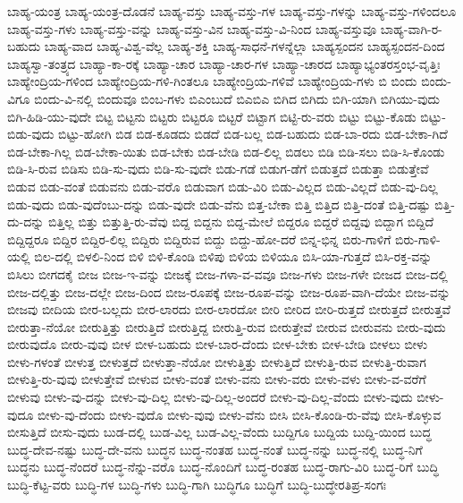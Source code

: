 {ಬಾಹ್ಯ-ಯಂತ್ರ
ಬಾಹ್ಯ-ಯಂತ್ರ-ದೊಡನೆ
ಬಾಹ್ಯ-ವಸ್ತು
ಬಾಹ್ಯ-ವಸ್ತು-ಗಳ
ಬಾಹ್ಯ-ವಸ್ತು-ಗಳನ್ನು
ಬಾಹ್ಯ-ವಸ್ತು-ಗಳಿಂದಲೂ
ಬಾಹ್ಯ-ವಸ್ತು-ಗಳು
ಬಾಹ್ಯ-ವಸ್ತು-ವನ್ನು
ಬಾಹ್ಯ-ವಸ್ತು-ವಿನ
ಬಾಹ್ಯ-ವಸ್ತು-ವಿ-ನಿಂದ
ಬಾಹ್ಯ-ವಸ್ತುವೂ
ಬಾಹ್ಯ-ವಾಗಿ-ರ-ಬಹುದು
ಬಾಹ್ಯ-ವಾದ
ಬಾಹ್ಯ-ವಿಶ್ವ-ವೆಲ್ಲ
ಬಾಹ್ಯ-ಶಕ್ತಿ
ಬಾಹ್ಯ-ಸಾಧನೆ-ಗಳನ್ನೆಲ್ಲಾ
ಬಾಹ್ಯಸ್ಪಂದನ
ಬಾಹ್ಯಸ್ಪಂದನ-ದಿಂದ
ಬಾಹ್ಯಸ್ವಾ-ತಂತ್ರ್ಯದ
ಬಾಹ್ಯಾ-ಕಾ-ರಕ್ಕೆ
ಬಾಹ್ಯಾ-ಚಾರ
ಬಾಹ್ಯಾ-ಚಾರ-ಗಳ
ಬಾಹ್ಯಾ-ಚಾರದ
ಬಾಹ್ಯಾಭ್ಯಂತರಸ್ತಂಭ-ವೃತ್ತಿಃ
ಬಾಹ್ಯೇಂದ್ರಿಯ-ಗಳಿಂದ
ಬಾಹ್ಯೇಂದ್ರಿಯ-ಗಳಿ-ಗಿಂತಲೂ
ಬಾಹ್ಯೇಂದ್ರಿಯ-ಗಳಿವೆ
ಬಾಹ್ಯೇಂದ್ರಿಯ-ಗಳು
ಬಿ
ಬಿಂದು
ಬಿಂದು-ವಿಗೂ
ಬಿಂದು-ವಿ-ನಲ್ಲಿ
ಬಿಂದುವೂ
ಬಿಂಬ-ಗಳು
ಬಿಎಂಬುದೆ
ಬಿಎಬಿಎ
ಬಿಗಿದ
ಬಿಗಿದು
ಬಿಗಿ-ಯಾಗಿ
ಬಿಗಿಯು-ವುದು
ಬಿಗಿ-ಹಿಡಿ-ಯು-ವುದೇ
ಬಿಟ್ಟ
ಬಿಟ್ಟನು
ಬಿಟ್ಟರು
ಬಿಟ್ಟರೂ
ಬಿಟ್ಟರೆ
ಬಿಟ್ಟಾಗ
ಬಿಟ್ಟಿ-ರು-ವರು
ಬಿಟ್ಟು
ಬಿಟ್ಟು-ಕೊಡು
ಬಿಟ್ಟು-ಬಿಡು-ವುದು
ಬಿಟ್ಟು-ಹೋಗಿ
ಬಿಡ
ಬಿಡ-ಕೂಡದು
ಬಿಡದೆ
ಬಿಡ-ಬಲ್ಲ
ಬಿಡ-ಬಹುದು
ಬಿಡ-ಬಾ-ರದು
ಬಿಡ-ಬೇಕಾ-ಗಿದೆ
ಬಿಡ-ಬೇಕಾ-ಗಿಲ್ಲ
ಬಿಡ-ಬೇಕಾ-ಯಿತು
ಬಿಡ-ಬೇಕು
ಬಿಡ-ಬೇಡಿ
ಬಿಡ-ಲಿಲ್ಲ
ಬಿಡಲು
ಬಿಡಿ
ಬಿಡಿ-ಸಲು
ಬಿಡಿ-ಸಿ-ಕೊಂಡು
ಬಿಡಿ-ಸಿ-ರುವ
ಬಿಡಿಸು
ಬಿಡಿ-ಸು-ವುದು
ಬಿಡಿ-ಸು-ವುದೇ
ಬಿಡು-ಗಡೆ
ಬಿಡುಗ-ಡೆಗೆ
ಬಿಡುತ್ತದೆ
ಬಿಡುತ್ತಾ
ಬಿಡುತ್ತೇವೆ
ಬಿಡುವ
ಬಿಡು-ವಂತೆ
ಬಿಡುವನು
ಬಿಡು-ವರೊ
ಬಿಡುವಾಗ
ಬಿಡು-ವಿರಿ
ಬಿಡು-ವಿಲ್ಲದ
ಬಿಡು-ವಿಲ್ಲದೆ
ಬಿಡು-ವು-ದಿಲ್ಲ
ಬಿಡು-ವುದು
ಬಿಡು-ವುದೆಂಬು-ದನ್ನು
ಬಿಡು-ವುದೇ
ಬಿಡು-ವೆನು
ಬಿತ್ತ-ಬೇಕಾ
ಬಿತ್ತಿ
ಬಿತ್ತಿದ
ಬಿತ್ತಿ-ದಂತೆ
ಬಿತ್ತಿ-ದಷ್ಟು
ಬಿತ್ತಿ-ದು-ದನ್ನು
ಬಿತ್ತಿಲ್ಲ
ಬಿತ್ತು
ಬಿತ್ತುತ್ತಿ-ರು-ವೆವು
ಬಿದ್ದ
ಬಿದ್ದನು
ಬಿದ್ದ-ಮೇಲೆ
ಬಿದ್ದರೂ
ಬಿದ್ದರೆ
ಬಿದ್ದವು
ಬಿದ್ದಾಗ
ಬಿದ್ದಿದೆ
ಬಿದ್ದಿದ್ದರೂ
ಬಿದ್ದಿರ
ಬಿದ್ದಿರ-ಲಿಲ್ಲ
ಬಿದ್ದಿರು
ಬಿದ್ದಿರುವ
ಬಿದ್ದು
ಬಿದ್ದು-ಹೋ-ದರೆ
ಬಿನ್ನ-ಭಿನ್ನ
ಬಿರು-ಗಾಳಿಗೆ
ಬಿರು-ಗಾಳಿ-ಯಲ್ಲಿ
ಬಿಲ-ದಲ್ಲಿ
ಬಿಳಲಿ-ನಿಂದ
ಬಿಳಿ
ಬಿಳಿ-ಕೊಂಡಿ
ಬಿಳಿಪು
ಬಿಳಿಯ
ಬಿಳಿಯೂ
ಬಿಸಿ-ಯಾ-ಗುತ್ತದೆ
ಬಿಸಿ-ರಕ್ತ-ವನ್ನು
ಬಿಸಿಲು
ಬೀಗದಕೈ
ಬೀಜ
ಬೀಜ-ಇ-ವನ್ನು
ಬೀಜಕ್ಕೆ
ಬೀಜ-ಗಳಾ-ವ-ವವೂ
ಬೀಜ-ಗಳು
ಬೀಜ-ಗಳೇ
ಬೀಜದ
ಬೀಜ-ದಲ್ಲಿ
ಬೀಜ-ದಲ್ಲಿತ್ತು
ಬೀಜ-ದಲ್ಲೇ
ಬೀಜ-ದಿಂದ
ಬೀಜ-ರೂಪಕ್ಕೆ
ಬೀಜ-ರೂಪ-ವನ್ನು
ಬೀಜ-ರೂಪ-ವಾಗಿ-ದೆಯೇ
ಬೀಜ-ವನ್ನು
ಬೀಜವು
ಬೀದಿಯ
ಬೀರ-ಬಲ್ಲದು
ಬೀರ-ಲಾರದು
ಬೀರ-ಲಾರದೋ
ಬೀರಿ
ಬೀರಿದ
ಬೀರಿ-ರುತ್ತದೆ
ಬೀರುತ್ತದೆ
ಬೀರುತ್ತವೆ
ಬೀರುತ್ತಾ-ನೆಯೋ
ಬೀರುತ್ತಿತ್ತು
ಬೀರುತ್ತಿದೆ
ಬೀರುತ್ತಿದ್ದ
ಬೀರುತ್ತಿ-ರುವ
ಬೀರುತ್ತೇವೆ
ಬೀರುವ
ಬೀರುವನು
ಬೀರು-ವುದು
ಬೀರುವುದೊ
ಬೀರು-ವುವು
ಬೀಳ
ಬೀಳ-ಬಹುದು
ಬೀಳ-ಬಾರ-ದೆಂದು
ಬೀಳ-ಬೇಕು
ಬೀಳ-ಬೇಡಿ
ಬೀಳಲು
ಬೀಳು
ಬೀಳು-ಗಳಂತೆ
ಬೀಳುತ್ತ
ಬೀಳುತ್ತದೆ
ಬೀಳುತ್ತಾ-ನೆಯೋ
ಬೀಳುತ್ತಿತ್ತು
ಬೀಳುತ್ತಿದೆ
ಬೀಳುತ್ತಿ-ರುವ
ಬೀಳುತ್ತಿ-ರುವಾಗ
ಬೀಳುತ್ತಿ-ರು-ವುವು
ಬೀಳುತ್ತೇವೆ
ಬೀಳುವ
ಬೀಳು-ವಂತೆ
ಬೀಳು-ವನು
ಬೀಳು-ವರು
ಬೀಳು-ವಳು
ಬೀಳು-ವ-ವರೆಗೆ
ಬೀಳುವು
ಬೀಳು-ವು-ದನ್ನು
ಬೀಳು-ವು-ದಿಲ್ಲ
ಬೀಳು-ವು-ದಿಲ್ಲ-ಅಂದರೆ
ಬೀಳು-ವು-ದಿಲ್ಲ-ವೆಂದು
ಬೀಳು-ವುದು
ಬೀಳು-ವುದೂ
ಬೀಳು-ವು-ದೆಂದು
ಬೀಳು-ವುದೊ
ಬೀಳು-ವುವು
ಬೀಳು-ವೆನು
ಬೀಸಿ
ಬೀಸಿ-ಕೊಂಡಿ-ರು-ವೆವು
ಬೀಸಿ-ಕೊಳ್ಳುವ
ಬೀಸುತ್ತಿದೆ
ಬೀಸು-ವುದು
ಬುಡ-ದಲ್ಲಿ
ಬುಡ-ವಿಲ್ಲ
ಬುಡ-ವಿಲ್ಲ-ವೆಂದು
ಬುದ್ದಿಗೂ
ಬುದ್ದಿಯ
ಬುದ್ದಿ-ಯಿಂದ
ಬುದ್ಧ
ಬುದ್ಧ-ದೇವ-ನಷ್ಟು
ಬುದ್ಧ-ದೇ-ವನು
ಬುದ್ಧನ
ಬುದ್ಧ-ನಂತಹ
ಬುದ್ಧ-ನಂತೆ
ಬುದ್ಧ-ನನ್ನು
ಬುದ್ಧ-ನಲ್ಲಿ
ಬುದ್ಧ-ನಿಗೆ
ಬುದ್ಧನು
ಬುದ್ಧ-ನೆಂದರೆ
ಬುದ್ಧ-ನೆನ್ನು-ವರೊ
ಬುದ್ಧ-ನೊಂದಿಗೆ
ಬುದ್ಧ-ರಂತಹ
ಬುದ್ಧ-ರಾಗು-ವಿರಿ
ಬುದ್ಧ-ರಿಗೆ
ಬುದ್ಧಿ
ಬುದ್ಧಿ-ಕೆಟ್ಟ-ವರು
ಬುದ್ಧಿ-ಗಳ
ಬುದ್ಧಿ-ಗಳು
ಬುದ್ಧಿ-ಗಾಗಿ
ಬುದ್ಧಿಗೂ
ಬುದ್ಧಿಗೆ
ಬುದ್ಧಿ-ಬುದ್ಧೇರತಿಪ್ರ-ಸಂಗಃ
}
